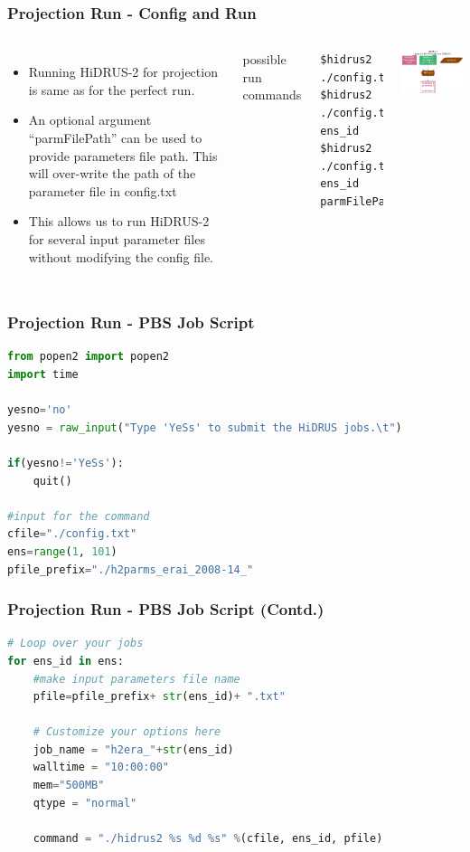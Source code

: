 \documentclass[aspectratio=169]{beamer}
\begin{document}
\begin{frame}[fragile]
\frametitle{Projection Run - Config and Run}
\begin{columns}

\begin{itemize}
\item Running HiDRUS-2 for projection is same as for the perfect run.
\item An optional argument ``parmFilePath''  can be used to provide parameters file path. This will over-write the path of the parameter file in config.txt
\item This allows us to run HiDRUS-2 for several input parameter files without modifying the config file.
\end{itemize}
possible run commands
\begin{lstlisting}[style=BashInputStyle]
$hidrus2 ./config.txt 
$hidrus2 ./config.txt ens_id
$hidrus2 ./config.txt ens_id parmFilePath
\end{lstlisting}

\includegraphics[width=2.9in]{../fig/runH2.pdf}

\end{columns}
\end{frame}
%
%
%
%
\begin{frame}[fragile]
\frametitle{Projection Run - PBS Job Script}
\begin{lstlisting}[language=Python]
from popen2 import popen2
import time

yesno='no'
yesno = raw_input("Type 'YeSs' to submit the HiDRUS jobs.\t")

if(yesno!='YeSs'):
    quit()

#input for the command
cfile="./config.txt"
ens=range(1, 101)
pfile_prefix="./h2parms_erai_2008-14_"

\end{lstlisting}

\end{frame}
%
%
%
%
\begin{frame}[fragile]
\frametitle{Projection Run - PBS Job Script (Contd.)}
\begin{lstlisting}[language=Python]
# Loop over your jobs
for ens_id in ens:
    #make input parameters file name
    pfile=pfile_prefix+ str(ens_id)+ ".txt"
     
    # Customize your options here
    job_name = "h2era_"+str(ens_id)
    walltime = "10:00:00"
    mem="500MB"
    qtype = "normal"

    command = "./hidrus2 %s %d %s" %(cfile, ens_id, pfile)

\end{lstlisting}

\end{frame}
\end{document}
